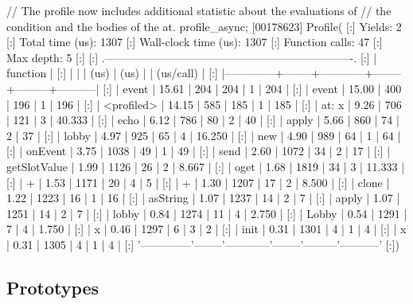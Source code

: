 \begin{urbiscript}
// The profile now includes additional statistic about the evaluations of
// the condition and the bodies of the at.
profile_async;
[00178623] Profile(
[:]  Yields:                    2
[:]  Total time (us):        1307
[:]  Wall-clock time (us):   1307
[:]  Function calls:           47
[:]  Max depth:                 5
[:]
[:]  .-------------------------------------------------------------------.
[:]  |   function   |   %
[:]  |              |        |    (us)    |  (us)  |         | (us/call) |
[:]  |--------------+--------+------------+--------+---------+-----------|
[:]  |        event |  15.61 |        204 |    204 |       1 |       204 |
[:]  |        event |  15.00 |        400 |    196 |       1 |       196 |
[:]  |   <profiled> |  14.15 |        585 |    185 |       1 |       185 |
[:]  |    at: { x } |   9.26 |        706 |    121 |       3 |    40.333 |
[:]  |         echo |   6.12 |        786 |     80 |       2 |        40 |
[:]  |        apply |   5.66 |        860 |     74 |       2 |        37 |
[:]  |        lobby |   4.97 |        925 |     65 |       4 |    16.250 |
[:]  |          new |   4.90 |        989 |     64 |       1 |        64 |
[:]  |      onEvent |   3.75 |       1038 |     49 |       1 |        49 |
[:]  |         send |   2.60 |       1072 |     34 |       2 |        17 |
[:]  | getSlotValue |   1.99 |       1126 |     26 |       2 |     8.667 |
[:]  |         oget |   1.68 |       1819 |     34 |       3 |    11.333 |
[:]  |            + |   1.53 |       1171 |     20 |       4 |         5 |
[:]  |            + |   1.30 |       1207 |     17 |       2 |     8.500 |
[:]  |        clone |   1.22 |       1223 |     16 |       1 |        16 |
[:]  |     asString |   1.07 |       1237 |     14 |       2 |         7 |
[:]  |        apply |   1.07 |       1251 |     14 |       2 |         7 |
[:]  |        lobby |   0.84 |       1274 |     11 |       4 |     2.750 |
[:]  |        Lobby |   0.54 |       1291 |      7 |       4 |     1.750 |
[:]  |            x |   0.46 |       1297 |      6 |       3 |         2 |
[:]  |         init |   0.31 |       1301 |      4 |       1 |         4 |
[:]  |            x |   0.31 |       1305 |      4 |       1 |         4 |
[:]  '--------------'--------'------------'--------'---------'-----------'
[:])
\end{urbiscript}

\subsection{Prototypes}

